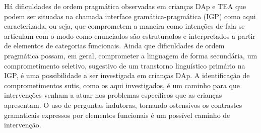 \documentclass[output=paper,colorlinks,citecolor=brown,booklanguage=portuguese]{langscibook}
\begin{document}
Há dificuldades de ordem pragmática observadas em crianças DAp e TEA que podem ser situadas na chamada interface gramática-pragmática (IGP) como aqui caracterizada, ou seja, que comprometem a maneira como intenções de fala se articulam com o modo como enunciados são estruturados e interpretados a partir de elementos de categorias funcionais. Ainda que dificuldades de ordem pragmática possam, em geral, comprometer a linguagem de forma secundária, um comprometimento seletivo, sugestivo de um transtorno linguístico primário na IGP, é uma possibilidade a ser investigada em crianças DAp. A identificação de comprometimentos sutis, como os aqui investigados, é um caminho para que intervenções venham a atuar nos problemas específicos que as crianças apresentam. O uso de perguntas indutoras, tornando ostensivos os contrastes gramaticais expressos por elementos funcionais é um possível caminho de intervenção. 



{\sloppy\printbibliography[heading=subbibliography,notkeyword=this]}
\end{document}
